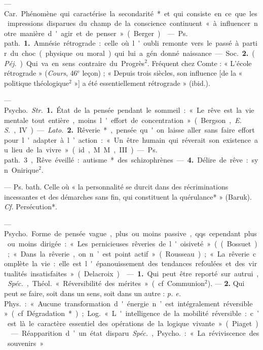 \begin{itemize}[leftmargin=1cm, label=, itemsep=1pt]
 — \si{Car.} Phénomène
qui caractérise la secondarité* et
qui consiste en ce que les impressions disparues du champ de la
conscience continuent « à influencer
notre manière d'agir et de penser »
(Berger).

 — \si{Ps. path.} {\bf 1.} Amnésie
rétrograde : celle où l'oubli remonte
vers le passé à partir du choc (physique ou moral) qui lui a gén. donné
naissance. — \si{Soc.} {\bf 2.} ({\it Péj.}) Qui va
en sens contraire du Progrès$^2$. Fréquent chez Comte : « L'école rétrograde » ({\it Cours}, 46$^\text{e}$ leçon) ; « Depuis
trois siècles, son influence [de la
« politique théologique$^2$ »] a été essentiellement rétrograde » (ibid.).

 — \si{Psycho.} {\it Str.} {\bf 1.} État de la
pensée pendant le sommeil : « Le
rêve est la vie mentale tout entière,
moins l'effort de concentration »
(Bergson, {\it E. S.}, IV). — {\it Lato.} {\bf 2.} Rêverie*, pensée qu'on laisse aller sans
faire effort pour l'adapter à l’action :
« Un être humain qui réverait son
existence au lieu de la vivre... » (id.,
M. M., III).

— \si{Ps. path.} 3, Rêve éveillé : autisme* des schizophrènes. — {\bf 4.} Délire de rêve : syn. Onirique$^2$.

 — Ps.
bath. Celle où « la personnalité se
durcit dans des récriminations incessantes et des démarches sans fin,
qui constituent la quérulance* »
(Baruk). {\it Cf.} Persécution*.

 — \si{Psycho.} Forme de pensée
vague, plus ou moins passive, qqs.
cependant plus ou moins dirigée :
« Les pernicieuses rêveries de l'oisiveté » ((Bossuet) ; « Dans la rêverie,
on n’est point actif » (Rousseau) ;
« La rêverie complète la vie : elle est
l'épanouissement des tendances refoulées et des virtualités insatisfaites » (Delacroix).

 — {\bf 1.} Qui peut être reporté
sur autrui, {\it Spéc.}, \si{Théol.} « Réversibilité des mérites » (cf. Communion$^2$). — {\bf 2.} Qui peut se faire, soit
dans un sens, soit dans un autre :
{\it p. e.} \si{Phys.} : « Aucune transformation
d'énergie n’est intégralement réversible » (cf. Dégradation*) ; \si{Log.}
« L'intelligence de la mobilité réversible : c’est là le caractère essentiel
des opérations de la logique vivante » (Piaget).

 — Réapparition d’un
état disparu. {\it Spéc.}, \si{Psycho.} : « La
réviviscence des souvenirs. »


\end{itemize}
